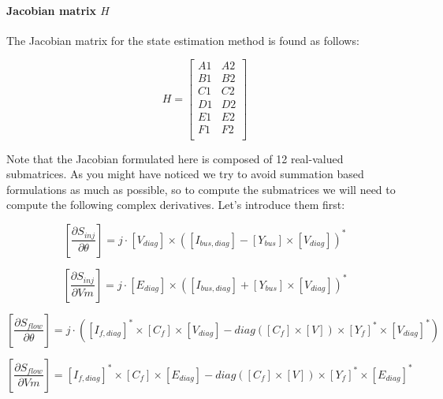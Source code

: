 \documentclass[nols,a4paper,twoside,notoc,fleqn]{tufte-book}
\begin{document}
\paragraph{Jacobian matrix $H$}

The Jacobian matrix for the state estimation method is found as follows:

\begin{equation}
H=
\left[
\begin{array}{cc}
A1 &
A2 \\
B1 &
B2 \\
C1 &
C2 \\
D1 &
D2 \\
E1 &
E2 \\
F1 &
F2 \\
\end{array}
\right]
\label{SE_jacobian}
\end{equation}

Note that the Jacobian formulated here is composed of 12 real-valued submatrices. As you might have noticed we try to avoid summation based formulations as much as possible, so to compute the submatrices we will need to compute the following complex derivatives. Let's introduce them first:


\begin{equation}
\left[ \frac{\partial S_{inj}}{\partial \theta} \right]  = j \cdot [V_{diag}] \times ([I_{bus,diag}] - [Y_{bus}] \times [V_{diag}]  )^* 
\end{equation}

\begin{equation}
\left[ \frac{\partial S_{inj}}{\partial Vm} \right]  = j \cdot [E_{diag}] \times ([I_{bus,diag}] + [Y_{bus}] \times [V_{diag} ] )^* 
\end{equation}

	


\begin{equation}
\left[ \frac{\partial S_{flow}}{\partial \theta}  \right]   = j \cdot ([I_{f,diag}]^* \times [C_f] \times[ V_{diag}] - diag([C_f] \times [V]) \times [Y_f]^* \times [V_{diag}]^* ) 
\end{equation}

\begin{equation}
\left[ \frac{\partial S_{flow}}{\partial Vm} \right]    = [I_{f,diag}]^* \times [C_f] \times [E_{diag}] - diag([C_f] \times [V]) \times [Y_f]^* \times [E_{diag}]^* 
\end{equation}
\end{document}
